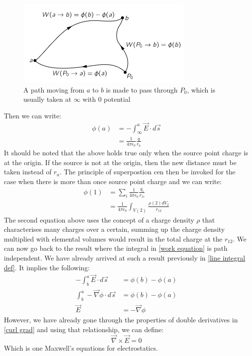 \begin{figure}[H]
	\centering 
	\includegraphics[scale = 0.5]{Lecture 1/images/path independence}
	\caption{A path moving from $a$ to $b$ is made to pass through $P_{0}$, which is usually taken at $\infty$ with 0 potential}
	\label{Illustration of the result obtained earlier}
\end{figure}
Then we can write: 
\begin{align}
	\phi(a) &= -\int_{\infty}^{a} \vec{E} \cdot d\vec{s}\\
	&= \frac{1}{4\pi \epsilon_{0}} \frac{q}{r_{a}} 
\end{align}
It should be noted that the above holds true only when the source point charge is at the origin. If the source is not at the origin, then the new distance must be taken instead of $r_{a}$. The principle of superpostion cen then be invoked for the case when there is more than once source point charge and we can write: 
\begin{align}
	\phi(1) &= \sum_{i} \frac{1}{4\pi \epsilon_{0}}\frac{q_{i}}{r_{1i}}\\
	&= \frac{1}{4\pi \epsilon_{0}}\int_{V(2)}\frac{\rho(2) dV_{2}}{r_{12}}
\end{align}
The second equation above uses the concept of a charge density $\rho$ that characterises many charges over a certain, summing up the charge density multiplied with elemental volumes would result in the total charge at the $r_{12}$. We can now go back to the result where the integral in \autoref{work equation} is path independent. We have already arrived at such a result previously in \autoref{line integral def}. It implies the following: 
\begin{align}
	-\int_{b}^{a} \vec{E} \cdot d\vec{s} &= \phi(b) - \phi(a)\\
	\int_{b}^{a} -\vec{\nabla}\phi \cdot d\vec{s} &= \phi(b) - \phi(a)\\
	\vec{E} &= -\vec{\nabla}\phi
\end{align}
However, we have already gone through the properties of double derivatives in \autoref{curl grad} and using that relationship, we can define: 
\begin{equation}
	\label{Maxwell eqn 2 for statics}
	\vec{\nabla} \times \vec{E} = 0
\end{equation}
Which is one Maxwell's equations for electrostatics. 
	

















